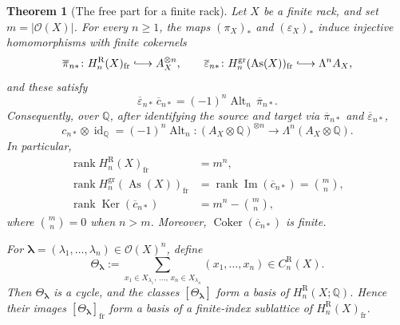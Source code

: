 \documentclass[11pt]{article}
\newtheorem{theorem}{Theorem}[section]
\DeclareMathOperator{\As}{As}
\DeclareMathOperator{\rank}{rank}
\DeclareMathOperator{\Ker}{Ker}
\DeclareMathOperator{\Coker}{Coker}
\newcommand{\QQ}{\mathbb Q}
\newcommand{\OO}{\mathcal O}
\newcommand{\gr}{\mathrm{gr}}
\newcommand{\R}{\mathrm R}
\begin{document}
\begin{theorem}[The free part for a finite rack]
\label{thm:finite-rack-free-image}
Let $X$ be a finite rack, and set $m=|\OO(X)|$. For every $n\ge1$, the maps
$(\pi_X)_*$ and $(\varepsilon_X)_*$ induce injective homomorphisms with finite
cokernels
\[
 \overline\pi_{n*}\colon
 H_n^\R(X)_{\mathrm{fr}}\lhook\joinrel\longrightarrow A_X^{\otimes n},
 \qquad
 \overline\varepsilon_{n*}\colon
 H_n^{\gr}(\As(X))_{\mathrm{fr}}\lhook\joinrel\longrightarrow\Lambda^nA_X,
\]
and these satisfy
\begin{equation}
 \overline\varepsilon_{n*}\,\overline c_{n*}
 =(-1)^n\operatorname{Alt}_n\,\overline\pi_{n*}.
 \label{eq:free-part-exterior-formula}
\end{equation}
Consequently, over $\QQ$, after identifying the source and target via
$\overline\pi_{n*}$ and $\overline\varepsilon_{n*}$,
\[
 c_{n*}\otimes\operatorname{id}_{\QQ}
 =(-1)^n\operatorname{Alt}_n
 \colon
 (A_X\otimes\QQ)^{\otimes n}
 \longrightarrow
 \Lambda^n(A_X\otimes\QQ).
\]
In particular,
\[
\begin{aligned}
 \rank H_n^\R(X)_{\mathrm{fr}}&=m^n,\\
 \rank H_n^{\gr}(\As(X))_{\mathrm{fr}}
 &=\rank\operatorname{Im}(\overline c_{n*})=\binom mn,\\
 \rank\Ker(\overline c_{n*})&=m^n-\binom mn,
\end{aligned}
\]
where $\binom mn=0$ when $n>m$. Moreover,
$\Coker(\overline c_{n*})$ is finite.

For $\boldsymbol\lambda=(\lambda_1,\ldots,\lambda_n)\in\OO(X)^n$, define
\[
\Theta_{\boldsymbol\lambda}
 :=\sum_{x_1\in X_{\lambda_1},\,\ldots,\,x_n\in X_{\lambda_n}}
 (x_1,\ldots,x_n)
 \in C_n^\R(X).
\]
Then $\Theta_{\boldsymbol\lambda}$ is a cycle, and the classes
$[\Theta_{\boldsymbol\lambda}]$ form a basis of $H_n^\R(X;\QQ)$. Hence their
images $[\Theta_{\boldsymbol\lambda}]_{\mathrm{fr}}$ form a basis of a
finite-index sublattice of $H_n^\R(X)_{\mathrm{fr}}$.
\end{theorem}
\end{document}

